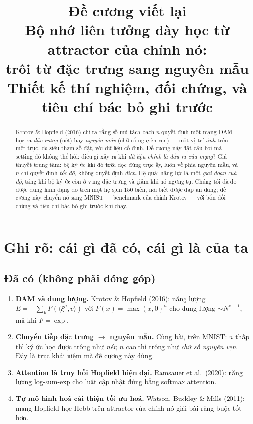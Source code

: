 \documentclass[11pt,a4paper]{article}
\title{\textbf{Đề cương viết lại}\\[2mm]
\Large Bộ nhớ liên tưởng dày học từ attractor của chính nó:\\
trôi từ đặc trưng sang nguyên mẫu\\[2mm]
\large \normalfont Thiết kế thí nghiệm, đối chứng, và tiêu chí bác bỏ ghi trước}
\author{}\date{}
\begin{document}
\maketitle\vspace{-8mm}

\begin{abstract}\noindent
Krotov \& Hopfield (2016) chỉ ra rằng số mũ tách bạch $n$ quyết định một mạng DAM
học ra \emph{đặc trưng} (nét) hay \emph{nguyên mẫu} (chữ số nguyên vẹn) --- một
vị trí \emph{tĩnh} trên một trục, do siêu tham số đặt, với dữ liệu cố định. Đề
cương này đặt câu hỏi mà setting đó không thể hỏi: điều gì xảy ra khi \emph{dữ
liệu chính là đầu ra của mạng}? Giả thuyết trung tâm: bộ ký ức khi đó
\textbf{trôi} dọc đúng trục ấy, luôn về phía nguyên mẫu, và $n$ chỉ quyết định
\emph{tốc độ}, không quyết định \emph{đích}. Hệ quả: năng lực là một \emph{giai
đoạn quá độ}, tăng khi bộ ký ức còn ở vùng đặc trưng và giảm khi nó ngưng tụ.
Chúng tôi đã đo được đúng hình dạng đó trên một hệ spin $150$ biến, nơi biết
được đáp án đúng; đề cương này chuyển nó sang MNIST --- benchmark của chính
Krotov --- với bốn đối chứng và tiêu chí bác bỏ ghi trước khi chạy.
\end{abstract}

\section{Ghi rõ: cái gì đã có, cái gì là của ta}

\subsection{Đã có (không phải đóng góp)}

\begin{enumerate}[leftmargin=7mm,itemsep=1mm]
\item \textbf{DAM và dung lượng.} Krotov \& Hopfield (2016): năng lượng
$E=-\sum_\mu F(\langle\xi^\mu,v\rangle)$ với $F(x)=\max(x,0)^n$ cho dung lượng
$\sim N^{n-1}$, mũ khi $F=\exp$.
\item \textbf{Chuyển tiếp đặc trưng $\to$ nguyên mẫu.} Cùng bài, trên MNIST:
$n$ thấp thì ký ức học được trông như \emph{nét}; $n$ cao thì trông như
\emph{chữ số nguyên vẹn}. Đây là trục khái niệm mà đề cương này dùng.
\item \textbf{Attention là truy hồi Hopfield hiện đại.} Ramsauer et al.\ (2020):
năng lượng log-sum-exp cho luật cập nhật đúng bằng softmax attention.
\item \textbf{Tự mô hình hoá cải thiện tối ưu hoá.} Watson, Buckley \& Mills
(2011): mạng Hopfield học Hebb trên attractor của chính nó giải bài ràng buộc
tốt hơn.
\end{enumerate}
\end{document}
